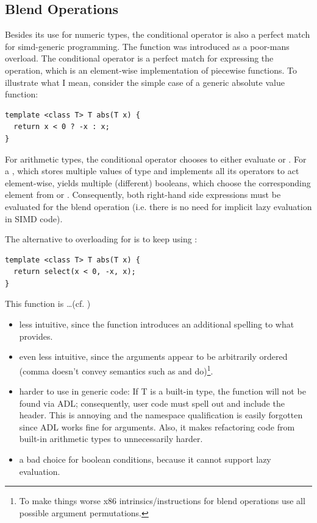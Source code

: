 \subsection{Blend Operations}\label{sec:blend}
Besides its use for numeric types, the conditional operator is also a perfect match for simd-generic programming.
The  function was introduced as a poor-mans  overload.
The conditional operator is a perfect match for expressing the  operation, which is an element-wise implementation of piecewise functions.
To illustrate what I mean, consider the simple case of a generic absolute value function:
\smallskip\begin{lstlisting}
template <class T> T abs(T x) {
  return x < 0 ? -x : x;
}
\end{lstlisting}
For arithmetic types, the conditional operator chooses to either evaluate  or .
For a , which stores multiple values of type  and implements all its operators to act element-wise,  yields multiple (different) booleans, which choose the corresponding element from  or .
Consequently, both right-hand side expressions must be evaluated for the blend operation (i.e. there is no need for implicit lazy evaluation in SIMD code).

The alternative to overloading  for  is to keep using :
\smallskip\begin{lstlisting}[style=Vc]
template <class T> T abs(T x) {
  return select(x < 0, -x, x);
}
\end{lstlisting}
This function is \ldots (cf. )
\begin{itemize}
  \item less intuitive, since the function introduces an additional spelling to what  provides.
  \item even less intuitive, since the arguments appear to be arbitrarily ordered (comma doesn't convey semantics such as  and \code{:} do)\footnote{To make things worse x86 intrinsics/instructions for blend operations use all possible argument permutations.}.
  \item harder to use in generic code:
    If \type T is a built-in type, the  function will not be found via ADL; consequently, user code must spell out  and include the  header.
    This is annoying and the namespace qualification is easily forgotten since ADL works fine for  arguments.
    Also, it makes refactoring code from built-in arithmetic types to  unnecessarily harder.
  \item a bad choice for boolean conditions, because it cannot support lazy evaluation.
\end{itemize}

